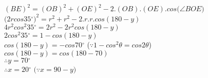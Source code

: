\documentclass[journal,12pt,twocolumn]{IEEEtran}
\renewcommand\thesection{\arabic{section}}
\begin{document}
\begin{enumerate}[label=\thesection.\arabic*.,ref=\thesection.\theenumi]
               $(BE)^2=(OB)^2+(OE)^2-2$.$(OB)$.$(OE)$.$cos($$\angle$$BOE)$\\ 
                $(2rcos 35$$^{\circ}$$)^2 = r^2+r^2 - 2$.$r$.$r$.$cos(180-y)$\\ 
                $4r^2cos^2 35$$^{\circ}$$=2r^2 - 2r^2cos(180-y)$\\ 
                $2cos^2 35$$^{\circ}$$=1-cos(180-y)$\\ 
                $cos(180-y)=-cos 70$$^{\circ}$       (${\because}$$1-cos^2$${\theta}$$=cos 2$${\theta}$)\\ 
               $cos(180-y)=cos(180-70)$\\ 
                ${\therefore}$$y=70$$^{\circ}$\\ 
               ${\therefore}$$x=20$$^{\circ}$             $($${\because}$$x=90-y)$\\  
               
               
\end{enumerate}
\end{document}
